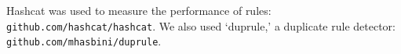 \documentclass[letterpaper,twocolumn,10pt]{article}
\begin{document}
Hashcat was used to measure the performance of rules:
\texttt{github.com/hashcat/hashcat}.
We also used
`duprule,' a duplicate rule detector:
\texttt{github.com/mhasbini/duprule}.





\end{document}
